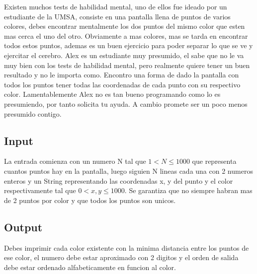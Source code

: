 
Existen muchos tests de habilidad mental, uno de ellos fue ideado por un estudiante de la UMSA, consiste en una pantalla llena de puntos de varios colores, debes encontrar mentalmente los dos puntos del mismo color que esten mas cerca el uno del otro. Obviamente a mas colores, mas se tarda en encontrar todos estos puntos, ademas es un buen ejercicio para poder separar lo que se ve y ejercitar el cerebro. 
Alex es un estudiante muy presumido, el sabe que no le va muy bien con los tests de habilidad mental, pero realmente quiere tener un buen resultado y no le importa como. Encontro una forma de dado la pantalla con todos los puntos tener todas las coordenadas de cada punto con su respectivo color. Lamentablemente Alex no es tan bueno programando como lo es presumiendo, por tanto solicita tu ayuda. A cambio promete ser un poco menos presumido contigo.

\subsection*{Input}

La entrada comienza con un numero N tal que $1 < N \leq 1000$ que representa cuantos puntos hay en la pantalla, luego siguien N lineas cada una con 2 numeros enteros y un String representando las coordenadas x, y del punto y el color respectivamente tal que $0 < x, y \leq 1000$. Se garantiza que no siempre habran mas de 2 puntos por color y que todos los puntos son unicos.

\subsection*{Output}

Debes imprimir cada color existente con la minima distancia entre los puntos de ese color, el numero debe estar aproximado con 2 digitos y el orden de salida debe estar ordenado alfabeticamente en funcion al color.

\datos
